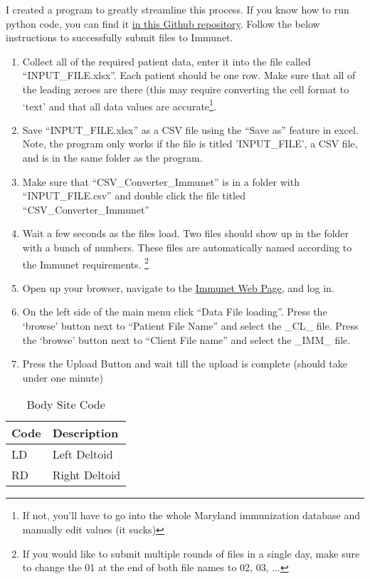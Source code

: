 \documentclass{article}
\begin{document}
I created a program to greatly streamline this process. If you know how to run python code, you can find it \href{https://github.com/m0rphe/Schreiber-Allergy-Immunet}{in this Github repository}. Follow the below instructions to successfully submit files to Immunet. 

\begin{enumerate}
    \item Collect all of the required patient data, enter it into the file called ``INPUT\_FILE.xlsx''. Each patient should be one row. Make sure that all of the leading zeroes are there (this may require converting the cell format to `text' and that all data values are accurate\footnote{If not, you'll have to go into the whole Maryland immunization database and manually edit values (it sucks) }. 
    \item Save ``INPUT\_FILE.xlsx'' as a CSV file using the ``Save as'' feature in excel. Note, the program only works if the file is titled 'INPUT\_FILE',  a CSV file, and is in the same folder as the program. 
    \item Make sure that ``CSV\_Converter\_Immunet'' is in a folder with ``INPUT\_FILE.csv'' and double click the file titled ``CSV\_Converter\_Immunet'' 
    \item Wait a few seconds as the files load. Two files should show up in the folder with a bunch of numbers. These files are automatically named according to the Immunet requirements. \footnote{If you would like to submit multiple rounds of files in a single day, make sure to change the 01 at the end of both file names to 02, 03, ... }
    \item Open up your browser, navigate to the \href{https://www.mdimmunet.org/}{Immunet Web Page}, and log in. 
    \item On the left side of the main menu click ``Data File loading''. Press the `browse' button next to ``Patient File Name'' and select the \_CL\_ file. Press the `browse' button next to ``Client File name'' and select the \_IMM\_ file. 
    \item Press the Upload Button and wait till the upload is complete (should take under one minute)
\end{enumerate}

\newpage


\begin{table}
\centering
\begin{tabular}{ll}
\toprule
\textbf{Code} & \textbf{Description} \\ \midrule
LD            & Left Deltoid         \\ 
RD            & Right Deltoid        \\ 
\bottomrule
\end{tabular}
\caption{Body Site Code}
\label{tab:BodyCode}
\end{table}
\end{document}
